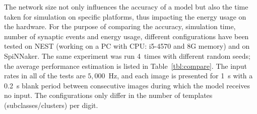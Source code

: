 The network size not only influences the accuracy of a model but also the time taken for simulation on specific platforms, thus impacting the energy usage on the hardware.
For the purpose of comparing the accuracy, simulation time, number of synaptic events and energy usage, different configurations have been tested on NEST (working on a PC with CPU: i5-4570 and 8G memory) and on SpiNNaker.
The same experiment was run 4~times with different random seeds; the average performance estimation is listed in Table~\ref{tbl:compare}.
The input rates in all of the tests are $5,000$~Hz, and each image is presented for 1~s with a 0.2~s blank period between consecutive images during which the model receives no input.
The configurations only differ in the number of templates (subclasses/clusters) per digit.
